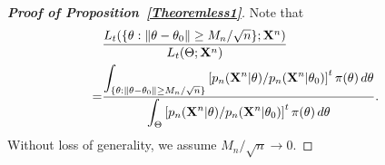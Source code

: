 \documentclass[11pt]{article}
\theoremstyle{plain}
\theoremstyle{definition}
\theoremstyle{remark}
\begin{document}
\begin{appendices}
\begin{proof}[\textbf{Proof of Proposition~\ref{Theoremless1}}]
    Note that
       \begin{equation}\label{eq:numden}
           \begin{split}
           &\frac{L_{t} (\{\theta: \|\theta-\theta_0\|\geq {M_n}/{\sqrt{n}}\};\mathbf{X}^{n})}
           {L_{t}(\Theta;\mathbf{X}^{n})}
           \\
=&
    \frac{\displaystyle
        \int_{\{\theta: \|\theta-\theta_0\|\geq {M_n}/{\sqrt{n}}\}} \left[ {p_n(\mathbf{X}^{n}|\theta)}/{p_n(\mathbf{X}^{n}|\theta_0)} \right]^{t} \pi(\theta) \, d \theta
    }{\displaystyle
        \int_{\Theta} \left[ {p_n(\mathbf{X}^{n}|\theta)}/{p_n(\mathbf{X}^{n}|\theta_0)} \right]^{t} \pi(\theta) \, d \theta
    }.
           \end{split}
       \end{equation}
    Without loss of generality, we assume ${M_n}/{\sqrt{n}}\to 0$.


\end{proof}
\end{appendices}
\end{document}
